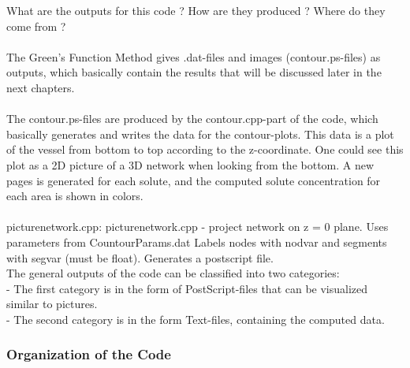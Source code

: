 What are the outputs for this code ? How are they produced ? Where do they come from ?
\\
\\The Green's Function Method gives .dat-files and images (contour.ps-files) as outputs, which basically contain the results that will be discussed later in the next chapters.
\\
\\The contour.ps-files are produced by the contour.cpp-part of the code, which basically generates and writes the data for the contour-plots. This data is a plot of the vessel from bottom to top according to the z-coordinate. One could see this plot as a 2D picture of a 3D network when looking from the bottom. A new pages is generated for each solute, and the computed solute concentration for each area is shown in colors.
\\
\\picturenetwork.cpp: picturenetwork.cpp - project network on z = 0 plane.
Uses parameters from CountourParams.dat
Labels nodes with nodvar and segments with segvar (must be float).
Generates a postscript file.
\\
The general outputs of the code can be classified into two categories:
\\- The first category is in the form of PostScript-files that can be visualized similar to pictures.
\\- The second category is in the form Text-files, containing the computed data.
\\

\subsubsection*{Organization of the Code}

